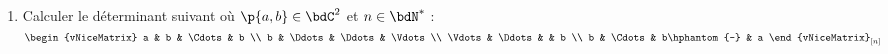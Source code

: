 \documentclass[a4paper,french,bookmarks]{article}
\begin{document}
\begin{enumerate}
\begin{nproof}
            
        \end{nproof}
        \yesbefore
        
        \item Calculer le déterminant suivant où $\p{a, b} \in \bdC^2$ et $n \in \bdN^*$ :
        \qquad $\begin{vNiceMatrix}
                    a       &   b       &   \Cdots  &   b       \\
                    b       &   \Ddots  &   \Ddots  &   \Vdots  \\
                    \Vdots  &   \Ddots  &           &   b       \\
                    b       &   \Cdots  &   b\hphantom{-}    &   a
                \end{vNiceMatrix}_{\left[n\right]}$
                

\end{enumerate}
\end{document}
